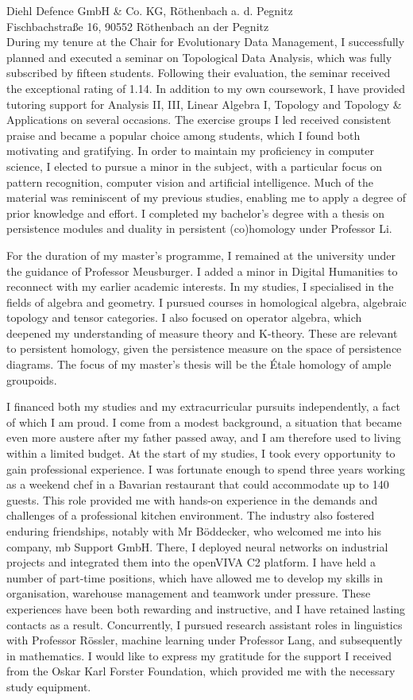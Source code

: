 \documentclass[11pt]{letter}
\begin{document}
\begin{letter}{%
Diehl Defence GmbH & Co. KG, Röthenbach a. d. Pegnitz\\%
Fischbachstraße 16, 90552 Röthenbach an der Pegnitz\\%
}
During my tenure at the Chair for Evolutionary Data Management, I successfully planned and executed a seminar on Topological Data Analysis, which was fully subscribed by fifteen students. Following their evaluation, the seminar received the exceptional rating of 1.14. In addition to my own coursework, I have provided tutoring support for Analysis II, III, Linear Algebra I, Topology and Topology & Applications on several occasions. The exercise groups I led received consistent praise and became a popular choice among students, which I found both motivating and gratifying. In order to maintain my proficiency in computer science, I elected to pursue a minor in the subject, with a particular focus on pattern recognition, computer vision and artificial intelligence. Much of the material was reminiscent of my previous studies, enabling me to apply a degree of prior knowledge and effort. I completed my bachelor's degree with a thesis on persistence modules and duality in persistent (co)homology under Professor Li.

For the duration of my master's programme, I remained at the university under the guidance of Professor Meusburger. I added a minor in Digital Humanities to reconnect with my earlier academic interests. In my studies, I specialised in the fields of algebra and geometry. I pursued courses in homological algebra, algebraic topology and tensor categories. I also focused on operator algebra, which deepened my understanding of measure theory and K-theory. These are relevant to persistent homology, given the persistence measure on the space of persistence diagrams. The focus of my master's thesis will be the Étale homology of ample groupoids.

I financed both my studies and my extracurricular pursuits independently, a fact of which I am proud. I come from a modest background, a situation that became even more austere after my father passed away, and I am therefore used to living within a limited budget. At the start of my studies, I took every opportunity to gain professional experience. I was fortunate enough to spend three years working as a weekend chef in a Bavarian restaurant that could accommodate up to 140 guests. This role provided me with hands-on experience in the demands and challenges of a professional kitchen environment. The industry also fostered enduring friendships, notably with Mr Böddecker, who welcomed me into his company, mb Support GmbH. There, I deployed neural networks on industrial projects and integrated them into the openVIVA C2 platform. I have held a number of part-time positions, which have allowed me to develop my skills in organisation, warehouse management and teamwork under pressure. These experiences have been both rewarding and instructive, and I have retained lasting contacts as a result. Concurrently, I pursued research assistant roles in linguistics with Professor Rössler, machine learning under Professor Lang, and subsequently in mathematics. I would like to express my gratitude for the support I received from the Oskar Karl Forster Foundation, which provided me with the necessary study equipment.


\end{letter}
\end{document}
